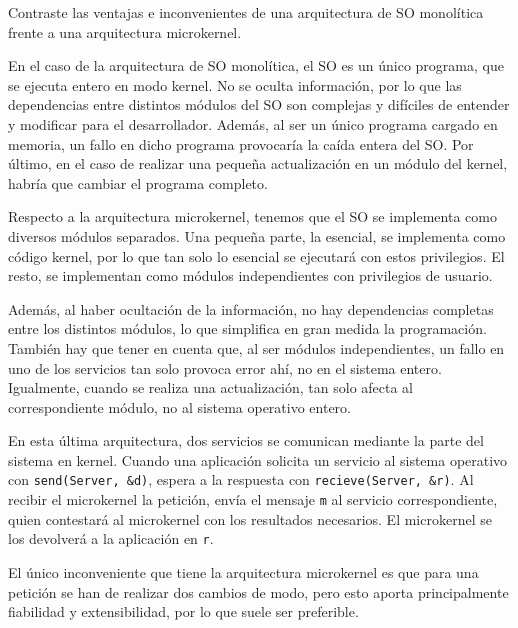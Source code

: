 \begin{ejercicio}
    Contraste las ventajas e inconvenientes de una arquitectura de SO monolítica frente a una arquitectura microkernel.

    En el caso de la arquitectura de SO monolítica, el SO es un único programa, que se ejecuta entero en modo kernel. No se oculta información, por lo que las dependencias entre distintos módulos del SO son complejas y difíciles de entender y modificar para el desarrollador. Además, al ser un único programa cargado en memoria, un fallo en dicho programa provocaría la caída entera del SO. Por último, en el caso de realizar una pequeña actualización en un módulo del kernel, habría que cambiar el programa completo.

    Respecto a la arquitectura microkernel, tenemos que el SO se implementa como diversos módulos separados. Una pequeña parte, la esencial, se implementa como código kernel, por lo que tan solo lo esencial se ejecutará con estos privilegios. El resto, se implementan como módulos independientes con privilegios de usuario.
    
    Además, al haber ocultación de la información, no hay dependencias completas entre los distintos módulos, lo que simplifica en gran medida la programación. También hay que tener en cuenta que, al ser módulos independientes, un fallo en uno de los servicios tan solo provoca error ahí, no en el sistema entero. Igualmente, cuando se realiza una actualización, tan solo afecta al correspondiente módulo, no al sistema operativo entero.

    En esta última arquitectura, dos servicios se comunican mediante la parte del sistema en kernel. Cuando una aplicación solicita un servicio al sistema operativo con \verb|send(Server, &d)|, espera a la respuesta con \verb|recieve(Server, &r)|.  Al recibir el microkernel la petición, envía el mensaje \verb|m| al servicio correspondiente, quien contestará al microkernel con los resultados necesarios. El microkernel se los devolverá a la aplicación en \verb|r|.

    El único inconveniente que tiene la arquitectura microkernel es que para una petición se han de realizar dos cambios de modo, pero esto aporta principalmente fiabilidad y extensibilidad, por lo que suele ser preferible.
\end{ejercicio}

